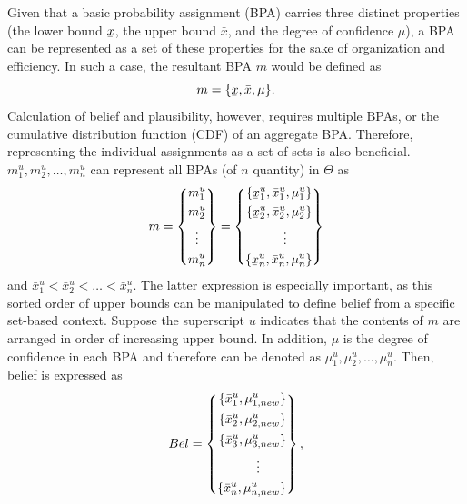 \documentclass[12pt]{uthesis-v12}  %
\newcommand{\ubar}[1]{\underaccent{\bar}{#1}}
\begin{document}
Given that a basic probability assignment (BPA) carries three distinct properties (the lower bound $\ubar{x}$, the upper bound $\bar{x}$, and the degree of confidence $\mu$), a BPA can be represented as a set of these properties for the sake of organization and efficiency. In such a case, the resultant BPA $m$ would be defined as \cite{elkin}
\begin{equation}
m = \{\ubar{x}, \bar{x}, \mu\}.
\label{bpam}
\end{equation}
Calculation of belief and plausibility, however, requires multiple BPAs, or the cumulative distribution function (CDF) of an aggregate BPA. Therefore, representing the individual assignments as a set of sets is also beneficial. $m_1^u, m_2^u,\dots,m_n^u$ can represent all BPAs (of $n$ quantity) in $\Theta$ as \cite{elkin}
\begin{equation}
m = \left\{
\begin{aligned}
m_1^u \\
m_2^u \\
\vdotswithin{m_n^u} \\
m_n^u
\end{aligned}
\right\}
= \left\{ 
\begin{aligned}
\{\ubar{x}_1^u, \bar{x}_1^u, \mu_1^u \} \\
\{\ubar{x}_2^u, \bar{x}_2^u, \mu_2^u \} \\
\vdotswithin{\ubar{x}_n^u, \bar{x}_n^u, \mu_n^u} \\
\{\ubar{x}_n^u, \bar{x}_n^u, \mu_n^u \}
\end{aligned}
\right\}
\label{m00}
\end{equation}
and $\bar{x}_1^u < \bar{x}_2^u < \dots < \bar{x}_n^u$. The latter expression is especially important, as this sorted order of upper bounds can be manipulated to define belief from a specific set-based context. Suppose the superscript $u$ indicates that the contents of $m$ are arranged in order of increasing upper bound. In addition, $\mu$ is the degree of confidence in each BPA and therefore can be denoted as $\mu_1^u,\mu_2^u,\dots,\mu_n^u$. Then, belief is expressed as \cite{elkin}
\begin{equation}
Bel = \left\{
\begin{aligned}
\{\bar{x}_1^u, \mu_{1,new}^u \} \\
\{\bar{x}_2^u, \mu_{2,new}^u \} \\
\{\bar{x}_3^u, \mu_{3,new}^u \} \\
\vdotswithin{\bar{x}_n^u, \mu_{n,new}^u} \\
\{\bar{x}_n^u, \mu_{n,new}^u \}
\end{aligned}
\right\},
\label{m0}
\end{equation}
\end{document}
